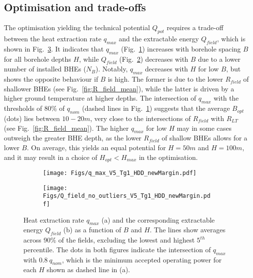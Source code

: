 \subsection{Optimisation and trade-offs}

The optimisation yielding the technical potential $Q_{pot}$ requires a trade-off between the heat extraction rate $q_{max}$ and the extractable energy $Q_{field}$, which is shown in Fig.~\ref{fig:optimisation}.
%
It indicates that $q_{max}$ (Fig.~\ref{fig:q_max}) increases with borehole spacing $B$ for all borehole depths $H$, while $Q_{field}$ (Fig.~\ref{fig:Q_field}) decreases with $B$ due to a lower number of installed BHEs ($N_B$).
Notably, $q_{max}$ decreases with $H$ for low $B$, but shows the opposite behaviour if $B$ is high.
The former is due to the lower $R_{field}$ of shallower BHEs (see Fig.~\ref{fig:R_field_mean}), while the latter is driven by a higher ground temperature at higher depths. 
%
The intersection of $q_{max}$ with the thresholds of 80\% of $q_{nom}$ (dashed lines in Fig.~\ref{fig:q_max}) suggests that the average $B_{opt}$ (dots) lies between $10-20m$, very close to the intersections of $R_{field}$ with $R_{LT}$ (see Fig.~\ref{fig:R_field_mean}). 
The higher $q_{max}$ for low $H$ may in some cases outweigh the greater BHE depth, as the lower $R_{field}$ of shallow BHEs allows for a lower $B$. 
On average, this yields an equal potential for $H = 50m$ and $H = 100m$, and it may result in a choice of $H_{opt} < H_{max}$ in the optimisation.


\begin{figure}[ht!]
\centering
\begin{subfigure}{.65\textwidth}
  \centering
  \texttt{[image: Figs/q\_max\_V5\_Tg1\_HDD\_newMargin.pdf]} 
  \subcaption{}
  \label{fig:q_max}
\end{subfigure}
\begin{subfigure}{.65\textwidth}
  \centering
  \texttt{[image: Figs/Q\_field\_no\_outliers\_V5\_Tg1\_HDD\_newMargin.pdf]} 
  \subcaption{}
  \label{fig:Q_field}
\end{subfigure}

\caption{Heat extraction rate $q_{max}$ (a) and  the corresponding extractable energy $Q_{field}$ (b) as a function of $B$ and $H$. 
The lines show averages across 90\% of the fields, excluding the lowest and highest $5^{th}$ percentile.
The dots in both figures indicate the intersection of $q_{max}$ with $0.8 \ q_{nom}$, which is the minimum accepted operating power for each $H$ shown as dashed line in (a).}
\label{fig:optimisation}
\end{figure}

